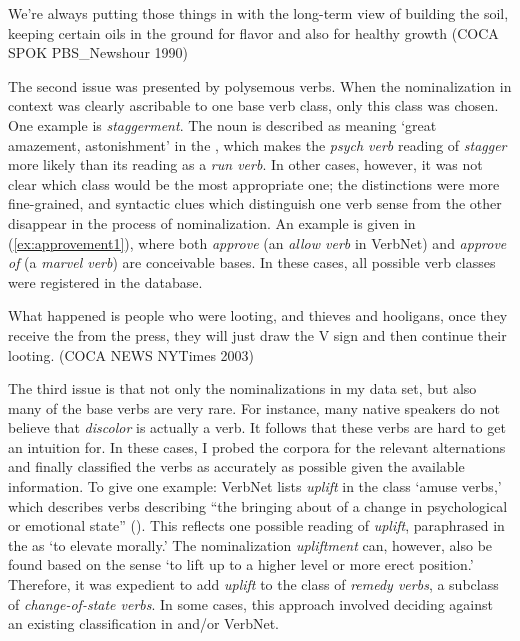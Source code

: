 \begin{exe}\singlespacing
	\ex \label{ex:tracement} We're always putting those things in with the long-term view of building the soil, keeping certain  oils in the ground for flavor and also for healthy growth {\small (\acs{COCA} SPOK PBS\_Newshour 1990)}
\end{exe}

\noindent The second issue was presented by polysemous verbs. When the nominalization in context was clearly ascribable to one base verb class, only this class was chosen. One example is \textit{staggerment}. The noun is described as meaning `great amazement, astonishment' in the , which makes the \textit{psych verb} reading of \textit{stagger} more likely than its reading as a \textit{run verb}. In other cases, however, it was not clear which class would be the most appropriate one; the distinctions were more fine-grained, and syntactic clues which distinguish one verb sense from the other disappear in the process of nominalization. 
An example is given in (\ref{ex:approvement1}), where both \textit{approve} (an \textit{allow verb} in VerbNet) and \textit{approve of} (a \textit{marvel verb}) are conceivable bases. In these cases, all possible verb classes were registered in the database. 

\begin{exe}\singlespacing
	\ex \label{ex:approvement1} What happened is people who were looting, and thieves and hooligans, once they receive the  from the press, they will just draw the V sign and then continue their looting. {\small (\acs{COCA} NEWS NYTimes 2003)}
\end{exe}

\noindent The third issue is that not only the nominalizations in my data set, but also many of the base verbs are very rare. For instance, many native speakers do not believe that \textit{discolor} is actually a verb. It follows that these verbs are hard to get an intuition for. In these cases, I probed the corpora for the relevant alternations and finally classified the verbs as accurately as possible given the available information. To give one example: VerbNet lists \textit{uplift} in the class `amuse verbs,' which describes verbs describing ``the bringing about of a change in psychological or emotional state'' (\citealt[191]{Levin.1993}). This reflects one possible reading of \textit{uplift}, paraphrased in the  as `to elevate morally.' The nominalization \textit{upliftment} can, however, also be found based on the sense `to lift up to a higher level or more erect position.' Therefore, it was expedient to add \textit{uplift} to the class of \textit{remedy verbs}, a subclass of \textit{change-of-state verbs}. In some cases, this approach involved deciding against an existing classification in \citet{Levin.1993} and/or VerbNet. 

